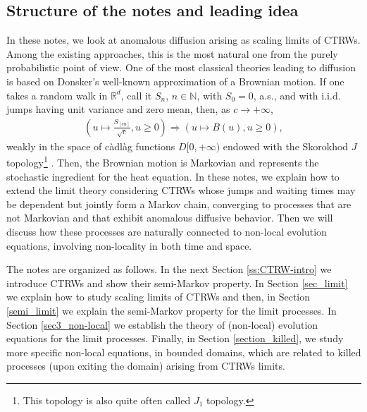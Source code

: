 \documentclass[reqno]{amsart}
\theoremstyle{remark}
\numberwithin{equation}{section} %
\newcommand{\1}{\mathds{1}}
\begin{document}
	\subsection{Structure of the notes and leading idea}
	In these notes, we look at anomalous diffusion arising as scaling limits of CTRWs. Among the existing approaches, this is the most natural one from the purely probabilistic point of view.
	One of the most classical theories leading to diffusion is based on Donsker's well-known approximation of a Brownian motion. If one takes a random walk in $\mathbb{R}^d$, call it $S_n$, $n \in \mathbb{N}$, with $S_0=0$, a.s., and with i.i.d. jumps having unit variance and zero mean, then, as $c \to +\infty$,
	\begin{align}
		\left(  u \mapsto \frac{S_{[cu]}}{\sqrt{c}}, u \geq 0 \right) \Longrightarrow \left( u \mapsto B(u), u \geq 0 \right),
	\end{align}
	weakly in the space of càdlàg functions $D[0, +\infty)$ endowed with the Skorokhod $J$ topology\footnote{This topology is also quite often called $J_1$ topology.} \cite{billingsley2013convergence, jacod2013limit}. Then, the Brownian motion is Markovian and represents the stochastic ingredient for the heat equation. In these notes, we explain how to extend the limit theory considering CTRWs whose jumps and waiting times may be dependent but jointly form a Markov chain, converging to processes that are not Markovian and that exhibit anomalous diffusive behavior. Then we will discuss how these processes are naturally connected to non-local evolution equations, involving non-locality in both time and space.
	
	The notes are organized as follows.
	In the next Section \ref{ss:CTRW-intro} we introduce CTRWs and show their semi-Markov property. In Section \ref{sec_limit} we  explain how to study scaling limits of CTRWs and then, in Section \ref{semi_limit} we explain the semi-Markov property for the limit processes. In Section \ref{sec3_non-local} we establish the theory of (non-local) evolution equations for the limit processes. Finally, in Section \ref{section_killed}, we study more specific non-local equations, in bounded domains, which are related to killed processes (upon exiting the domain) arising from CTRWs limits.
	
\end{document}

